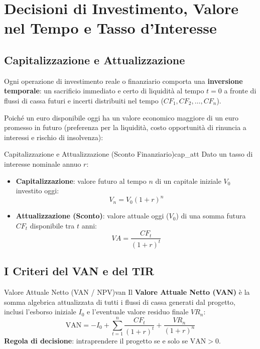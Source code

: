 \section{Decisioni di Investimento, Valore nel Tempo e Tasso d'Interesse}

\subsection{Capitalizzazione e Attualizzazione}
Ogni operazione di investimento reale o finanziario comporta una \textbf{inversione temporale}: un sacrificio immediato e certo di liquidità al tempo $t=0$ a fronte di flussi di cassa futuri e incerti distribuiti nel tempo ($CF_1, CF_2, \dots, CF_n$).

Poiché un euro disponibile oggi ha un valore economico maggiore di un euro promesso in futuro (preferenza per la liquidità, costo opportunità di rinuncia a interessi e rischio di insolvenza):

\begin{definizione}{Capitalizzazione e Attualizzazione (Sconto Finanziario)}{cap_att}
Dato un tasso di interesse nominale annuo $r$:
\begin{itemize}
    \item \textbf{Capitalizzazione}: valore futuro al tempo $n$ di un capitale iniziale $V_0$ investito oggi:
    \begin{equation}
        V_n = V_0 (1 + r)^n
    \end{equation}
    \item \textbf{Attualizzazione (Sconto)}: valore attuale oggi ($V_0$) di una somma futura $CF_t$ disponibile tra $t$ anni:
    \begin{equation}
        VA = \frac{CF_t}{(1 + r)^t}
    \end{equation}
\end{itemize}
\end{definizione}

\subsection{I Criteri del VAN e del TIR}

\begin{definizione}{Valore Attuale Netto (VAN / NPV)}{van}
Il \textbf{Valore Attuale Netto (VAN)} è la somma algebrica attualizzata di tutti i flussi di cassa generati dal progetto, inclusi l'esborso iniziale $I_0$ e l'eventuale valore residuo finale $VR_n$:
\begin{equation}
    \mathrm{VAN} = -I_0 + \sum_{t=1}^n \frac{CF_t}{(1 + r)^t} + \frac{VR_n}{(1 + r)^n}
\end{equation}
\textbf{Regola di decisione}: intraprendere il progetto se e solo se $\mathrm{VAN} > 0$.
\end{definizione}

